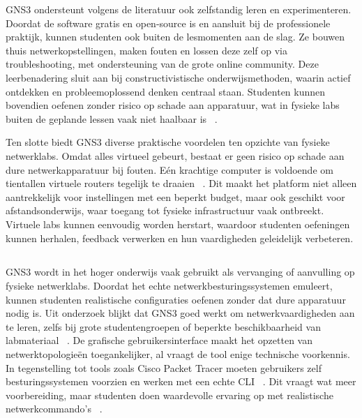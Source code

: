 \vspace{0.3cm}

GNS3 ondersteunt volgens de literatuur ook zelfstandig leren en experimenteren. Doordat de software gratis en open-source is en aansluit bij de professionele praktijk, kunnen studenten ook buiten de lesmomenten aan de slag. Ze bouwen thuis netwerkopstellingen, maken fouten en lossen deze zelf op via troubleshooting, met ondersteuning van de grote online community. Deze leerbenadering sluit aan bij constructivistische onderwijsmethoden, waarin actief ontdekken en probleemoplossend denken centraal staan. Studenten kunnen bovendien oefenen zonder risico op schade aan apparatuur, wat in fysieke labs buiten de geplande lessen vaak niet haalbaar is ~\autocite{Sari2018}.

\vspace{0.3cm}

Ten slotte biedt GNS3 diverse praktische voordelen ten opzichte van fysieke netwerklabs. Omdat alles virtueel gebeurt, bestaat er geen risico op schade aan dure netwerkapparatuur bij fouten. Eén krachtige computer is voldoende om tientallen virtuele routers tegelijk te draaien ~\autocite{Golightly2023}. Dit maakt het platform niet alleen aantrekkelijk voor instellingen met een beperkt budget, maar ook geschikt voor afstandsonderwijs, waar toegang tot fysieke infrastructuur vaak ontbreekt. Virtuele labs kunnen eenvoudig worden herstart, waardoor studenten oefeningen kunnen herhalen, feedback verwerken en hun vaardigheden geleidelijk verbeteren.

\subsection{}

GNS3 wordt in het hoger onderwijs vaak gebruikt als vervanging of aanvulling op fysieke netwerklabs. Doordat het echte netwerkbesturingssystemen emuleert, kunnen studenten realistische configuraties oefenen zonder dat dure apparatuur nodig is. Uit onderzoek blijkt dat GNS3 goed werkt om netwerkvaardigheden aan te leren, zelfs bij grote studentengroepen of beperkte beschikbaarheid van labmateriaal ~\autocite{Amrizal2022}. De grafische gebruikersinterface maakt het opzetten van netwerktopologieën toegankelijker, al vraagt de tool enige technische voorkennis. In tegenstelling tot tools zoals Cisco Packet Tracer moeten gebruikers zelf besturingssystemen voorzien en werken met een echte CLI ~\autocite{Sari2018}. Dit vraagt wat meer voorbereiding, maar studenten doen waardevolle ervaring op met realistische netwerkcommando’s ~\autocite{Amrizal2022}.

